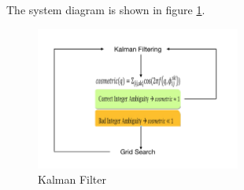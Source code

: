 \documentclass[journal,onecolumn]{IEEEtran}
\begin{document}
The system diagram is shown in figure \ref{kalman}.
\begin{figure}
  \centering
  \captionsetup{justification=centering}
  \includegraphics[width=0.6\textwidth]{fig/kalman.png}
  \caption{Kalman Filter}
  \label{kalman}
\end{figure}
\end{document}
